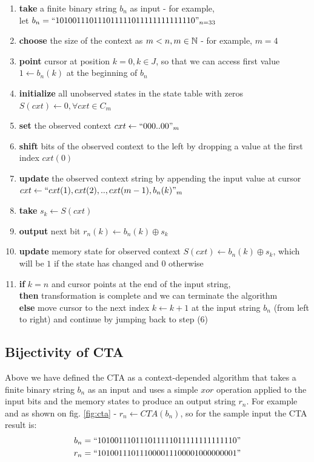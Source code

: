 \begin{enumerate}
\item \textbf{take} a finite binary string $b_n$ as input - for example,\\ let $b_n = \text{``}101001110111011111011111111111110\text{''}_{n=33}$
\item \textbf{choose} the size of the context as $m < n, m \in \mathbb{N}$ - for example, $m=4$
\item \textbf{point} cursor at position $k=0,k \in J$, so that we can access first value $1 \leftarrow b_n(k)$ at the beginning of $b_n$
\item \textbf{initialize} all unobserved states in the state table with zeros \\$S(cxt) \leftarrow 0, \forall cxt \in C_m$ 
\item \textbf{set} the observed context $cxt \leftarrow \text{``} 000..00\text{''}_m$
\item \textbf{shift} bits of the observed context to the left by dropping a value at the first index $cxt(0)$ 
\item \textbf{update} the observed context string by appending the input value at cursor $cxt \leftarrow \text{``} cxt(1), cxt(2), .., cxt(m-1), b_n(k)\text{''}_m$
\item \textbf{take} $s_k \leftarrow S(cxt)$
\item \textbf{output} next bit $r_n(k) \leftarrow b_n(k) \oplus s_k$
\item \textbf{update} memory state for observed context $S(cxt) \leftarrow b_n(k) \oplus s_k$, which will be $1$ if the state has changed and $0$ otherwise
\item \textbf{if} $k = n$ and cursor points at the end of the input string, 
\\ \textbf{then} transformation is complete and we can terminate the algorithm
\\ \textbf{else} move cursor to the next index $ k \leftarrow k + 1$ at the input string $b_n$ (from left to right) and continue by jumping back to step (6) 
\end{enumerate}

\subsection{Bijectivity of CTA}

Above we have defined the CTA as a context-depended algorithm that takes a finite binary string $b_n$ as an input and uses a simple $xor$ operation applied to the input bits and the memory states to produce an output string $r_n$. For example and as shown on fig. \ref{fig:cta} - $r_n \leftarrow CTA(b_n)$, so for the sample input the CTA result is: \begin{align*}
b_n = \text{``}101001110111011111011111111111110\text{''}
\\ r_n = \text{``}101001110111000011100001000000001\text{''}
\end{align*}

